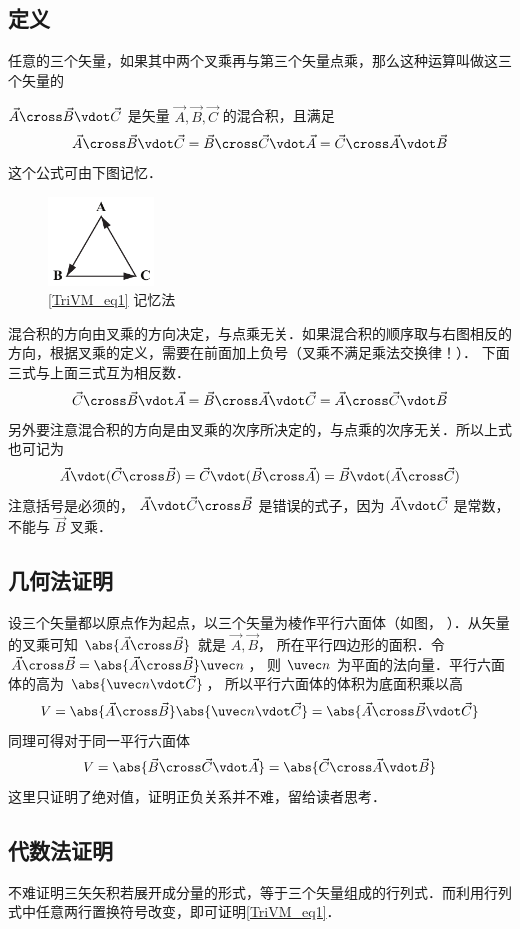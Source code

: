 
\subsection{定义}

任意的三个矢量，如果其中两个叉乘再与第三个矢量点乘，那么这种运算叫做这三个矢量的

$\vec A \cross \vec B \vdot \vec C$ 是矢量 $\vec A, \vec B, \vec C$ 的混合积，且满足
\begin{equation}\label{TriVM_eq1}
\vec A \cross \vec B \vdot \vec C = \vec B \cross \vec C \vdot \vec A = \vec C \cross \vec A \vdot \vec B 
\end{equation} 
这个公式可由下图记忆．
\begin{figure}[ht]
\centering
\includegraphics[width=0.25\textwidth]{./figures/TriVM1.pdf}
\caption{\autoref{TriVM_eq1} 记忆法}
\end{figure}
混合积的方向由叉乘的方向决定，与点乘无关．如果混合积的顺序取与右图相反的方向，根据叉乘的定义，需要在前面加上负号（叉乘不满足乘法交换律！）． 下面三式与上面三式互为相反数．
\begin{equation}
\vec C \cross \vec B \vdot \vec A = \vec B \cross \vec A \vdot \vec C = \vec A \cross \vec C \vdot \vec B
\end{equation} 
另外要注意混合积的方向是由叉乘的次序所决定的，与点乘的次序无关．所以上式也可记为
 \begin{equation}
\vec A \vdot (\vec C \cross \vec B) = \vec C \vdot (\vec B \cross \vec A) = \vec B \vdot (\vec A \cross \vec C)
\end{equation} 
注意括号是必须的， $\vec A \vdot \vec C \cross \vec B$ 是错误的式子，因为 $\vec A \vdot \vec C$ 是常数，不能与 $\vec B$ 叉乘．


\subsection{几何法证明}

设三个矢量都以原点作为起点，以三个矢量为棱作平行六面体（如图，%
）．从矢量的叉乘可知 $\abs{\vec A \cross \vec B}$ 就是 $\vec A,\vec B$，  所在平行四边形的面积．令 $\vec A \cross \vec B = \abs{\vec A \cross \vec B} \uvec n$， 则 $\uvec n$ 为平面的法向量．平行六面体的高为 $\abs{\uvec n \vdot \vec C}$， 所以平行六面体的体积为底面积乘以高
\begin{equation}
V = \abs{\vec A \cross \vec B} \abs{\uvec n \vdot \vec C} = \abs{\vec A \cross \vec B \vdot \vec C}
\end{equation}
同理可得对于同一平行六面体
\begin{equation}
V = \abs{\vec B \cross \vec C \vdot \vec A} = \abs{\vec C \cross \vec A \vdot \vec B} 
\end{equation}  
这里只证明了绝对值，证明正负关系并不难，留给读者思考．

\subsection{代数法证明}
不难证明三矢矢积若展开成分量的形式，等于三个矢量组成的行列式．而利用行列式中任意两行置换符号改变，即可证明\autoref{TriVM_eq1}．



